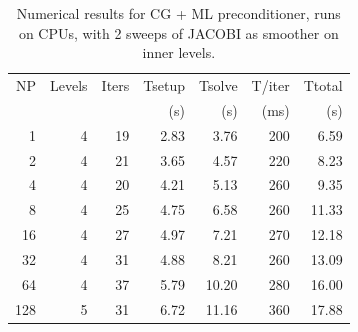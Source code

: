 \begin{table}[h!]
\centering
\caption{Numerical results for CG + ML preconditioner, runs on CPUs, with 2 sweeps of JACOBI as smoother on inner levels.}
\label{cpu-jac}

\begin{tabular}{rrrrrrr}
NP  & Levels & Iters & Tsetup & Tsolve & T/iter & Ttotal \\
    &        &       & (s)    & (s)    & (ms)   & (s)    \\
\hline
1   & 4       & 19  & 2.83  & 3.76  & 200   & 6.59    \\
2   & 4       & 21  & 3.65  & 4.57  & 220   & 8.23    \\
4   & 4       & 20  & 4.21  & 5.13  & 260   & 9.35    \\
8   & 4       & 25  & 4.75  & 6.58  & 260   & 11.33   \\
16  & 4       & 27  & 4.97  & 7.21  & 270   & 12.18   \\
32  & 4       & 31  & 4.88  & 8.21  & 260   & 13.09   \\
64  & 4       & 37  & 5.79  & 10.20 & 280   & 16.00   \\
128 & 5       & 31  & 6.72  & 11.16 & 360   & 17.88  \\
\hline
\end{tabular}
\end{table}

